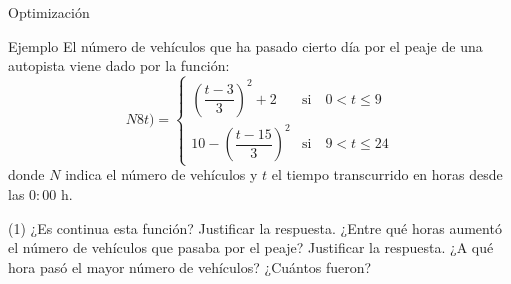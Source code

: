\documentclass[8pt]{beamer}
\begin{document}
\begin{frame}[t]{Optimización}
\begin{exampleblock}{Ejemplo}
El número de vehículos que ha pasado cierto día por el peaje de una autopista viene dado por la función: 
\[ N8t)=\begin{cases}  \left( \dfrac{t-3}{3} \right)^2+2 & \text{si} \quad 0<t \leq 9 \\ 10-\left( \dfrac{t-15}{3} \right)^2 & \text{si} \quad 9<t \leq 24 \end{cases}  \]
donde $N$ indica el número de vehículos y $t$ el tiempo transcurrido en horas desde las $0:00$ h.
\begin{tasks}[label=\alph*)](1)
\task ¿Es continua esta función? Justificar la respuesta.
\task ¿Entre qué horas aumentó el número de vehículos que pasaba por el peaje? Justificar la respuesta.
\task ¿A qué hora pasó el mayor número de vehículos? ¿Cuántos fueron?
\end{tasks}
\end{exampleblock}
\end{frame}
\end{document}
